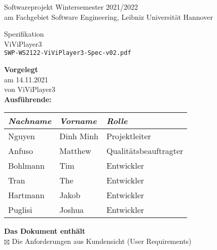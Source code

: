 \documentclass[a4paper, 12pt]{article}
\begin{document}
	\thispagestyle{empty} %
	\begin{center}
		{\Huge Softwareprojekt Wintersemester 2021/2022}\\[.35cm]
		{\large am Fachgebiet Software Engineering, Leibniz Universität Hannover}\\[.1cm]
	\end{center}
	\begin{center}
	\colorbox{lightlightgray}{
		\begin{minipage}{\linewidth}
			\begin{center}
				\vspace{0.2cm}
				{\Huge Spezifikation}\\[.1cm]
				{\Huge ViViPlayer3}\\[.3cm]
				\texttt{SWP-WS2122-ViViPlayer3-Spec-v02.pdf}
				\vspace{0.2cm}
			\end{center}
		\end{minipage}
	}
	\end{center}
	\textbf{Vorgelegt}\\
		\hspace*{1cm}am 14.11.2021 \\
		\hspace*{1cm}von ViViPlayer3\\[0.2cm]
	\textbf{Ausführende:}
		\begin{center}
			\begin{tabular}{|l|l|l|}
				\hline
				\textit{Nachname} 				& \textit{Vorname} 	& \textit{Rolle} \\ \hline\hline
				Nguyen							& Dinh Minh			& Projektleiter \\ \hline
				Anfuso							& Matthew			& Qualitätsbeauftragter \\ \hline
				Bohlmann						& Tim				& Entwickler \\ \hline
				Tran							& The				& Entwickler \\ \hline
				Hartmann						& Jakob				& Entwickler \\ \hline
				Puglisi							& Joshua			& Entwickler \\ \hline
			\end{tabular}
		\end{center}
		\vspace{0.3cm}
	\textbf{Das Dokument enthält}\\[0.1cm]
		\hspace*{1cm}$\boxtimes$ Die Anforderungen aus Kundensicht (User Requirements)\\[0.1cm]
\end{document}

